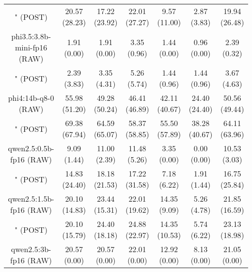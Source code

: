 \begin{table}[]
{\begin{tabular}{ccccccc}
      \multicolumn{1}{c|}{" (POST)} & 20.57 (28.23) & 17.22 (23.92) & \multicolumn{1}{c|}{22.01 (27.27)} & 9.57 (11.00) & \multicolumn{1}{c|}{2.87 (3.83)} & 19.94 (26.48) \\
      \cline{1-7}

      \multicolumn{1}{c|}{phi3.5:3.8b-mini-fp16 (RAW)} & 1.91 (0.00) & 1.91 (0.00) & \multicolumn{1}{c|}{3.35 (0.96)} & 1.44 (0.00) & \multicolumn{1}{c|}{0.96 (0.00)} & 2.39 (0.32) \\

      \multicolumn{1}{c|}{" (POST)} & 2.39 (3.83) & 3.35 (4.31) & \multicolumn{1}{c|}{5.26 (5.74)} & 1.44 (0.96) & \multicolumn{1}{c|}{1.44 (0.96)} & 3.67 (4.63) \\
      \cline{1-7}

      \multicolumn{1}{c|}{phi4:14b-q8-0 (RAW)} & 55.98 (51.20) & 49.28 (50.24) & \multicolumn{1}{c|}{46.41 (46.89)} & 42.11 (40.67) & \multicolumn{1}{c|}{24.40 (24.40)} & 50.56 (49.44) \\

      \multicolumn{1}{c|}{" (POST)} & 69.38 (67.94) & 64.59 (65.07) & \multicolumn{1}{c|}{58.37 (58.85)} & 55.50 (57.89) & \multicolumn{1}{c|}{38.28 (40.67)} & 64.11 (63.96) \\
      \cline{1-7}

      \multicolumn{1}{c|}{qwen2.5:0.5b-fp16 (RAW)} & 9.09 (1.44) & 11.00 (2.39) & \multicolumn{1}{c|}{11.48 (5.26)} & 3.35 (0.00) & \multicolumn{1}{c|}{0.00 (0.00)} & 10.53 (3.03) \\

      \multicolumn{1}{c|}{" (POST)} & 14.83 (24.40) & 18.18 (21.53) & \multicolumn{1}{c|}{17.22 (31.58)} & 7.18 (6.22) & \multicolumn{1}{c|}{1.91 (1.44)} & 16.75 (25.84) \\
      \cline{1-7}

      \multicolumn{1}{c|}{qwen2.5:1.5b-fp16 (RAW)} & 20.10 (14.83) & 23.44 (15.31) & \multicolumn{1}{c|}{22.01 (19.62)} & 14.35 (9.09) & \multicolumn{1}{c|}{5.26 (4.78)} & 21.85 (16.59) \\

      \multicolumn{1}{c|}{" (POST)} & 20.10 (15.79) & 24.40 (18.18) & \multicolumn{1}{c|}{24.88 (22.97)} & 14.35 (10.53) & \multicolumn{1}{c|}{5.74 (6.22)} & 23.13 (18.98) \\
      \cline{1-7}

      \multicolumn{1}{c|}{qwen2.5:3b-fp16 (RAW)} & 20.57 (0.00) & 20.57 (0.00) & \multicolumn{1}{c|}{22.01 (0.00)} & 12.92 (0.00) & \multicolumn{1}{c|}{8.13 (0.00)} & 21.05 (0.00) \\


\end{tabular}}
\end{table}
